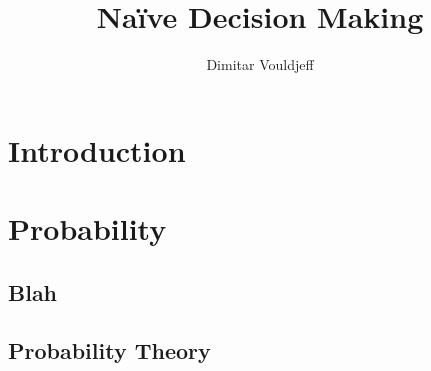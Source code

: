 \documentclass[12pt, a4paper,leqno]{report}
\title{Naïve Decision Making}
\author{Dimitar Vouldjeff}
\begin{document}
\maketitle


\chapter{Introduction}


\chapter{Probability}

\section{Blah}


\section{Probability Theory}

\end{document}
